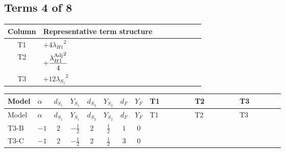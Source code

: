 \documentclass[8pt]{article}
\begin{document}
\begin{landscape}
\subsection*{Terms 4 of 8}
\begin{center}
\begin{tabular}{@{}c >{\raggedright\arraybackslash}p{0.82\linewidth}@{}}
\toprule
Column & Representative term structure \\
\midrule
T1 & \(\displaystyle +4 {\lambda_{H1}}^2\) \\
\midrule
T2 & \(\displaystyle +\frac{{\lambda_{H1}^{\rm Adj}}^2}{4}\) \\
\midrule
T3 & \(\displaystyle +12 {\lambda_{S_1}}^2\) \\
\midrule
\bottomrule
\end{tabular}
\end{center}
\smallskip
\tiny
\begin{longtable}{@{}llcccccc >{\raggedright\arraybackslash}p{0.21\linewidth} >{\raggedright\arraybackslash}p{0.21\linewidth} >{\raggedright\arraybackslash}p{0.21\linewidth}@{}}
\toprule
Model & $\alpha$ & $d_{S_1}$ & $Y_{S_1}$ & $d_{S_2}$ & $Y_{S_2}$ & $d_F$ & $Y_F$ & T1 & T2 & T3 \\
\midrule
\endfirsthead
\toprule
Model & $\alpha$ & $d_{S_1}$ & $Y_{S_1}$ & $d_{S_2}$ & $Y_{S_2}$ & $d_F$ & $Y_F$ & T1 & T2 & T3 \\
\midrule
\endhead
T3-B & $-1$ & $2$ & $-\frac{1}{2}$ & $2$ & $\frac{1}{2}$ & $1$ & $0$ & \scriptsize\adjustbox{max width=\linewidth}{$\begin{gathered} +4 {\lambda_{H1}}^2\end{gathered}$} & \scriptsize\adjustbox{max width=\linewidth}{$\begin{gathered} +\frac{{\lambda_{H1}^{\rm Adj}}^2}{4}\end{gathered}$} & \scriptsize\adjustbox{max width=\linewidth}{$\begin{gathered} +12 {\lambda_{S_1}}^2\end{gathered}$} \\
\midrule
T3-C & $-1$ & $2$ & $-\frac{1}{2}$ & $2$ & $\frac{1}{2}$ & $3$ & $0$ & \scriptsize\adjustbox{max width=\linewidth}{$\begin{gathered} +4 {\lambda_{H1}}^2\end{gathered}$} & \scriptsize\adjustbox{max width=\linewidth}{$\begin{gathered} +\frac{{\lambda_{H1}^{\rm Adj}}^2}{4}\end{gathered}$} & \scriptsize\adjustbox{max width=\linewidth}{$\begin{gathered} +12 {\lambda_{S_1}}^2\end{gathered}$} \\

\end{longtable}
\end{landscape}
\end{document}
